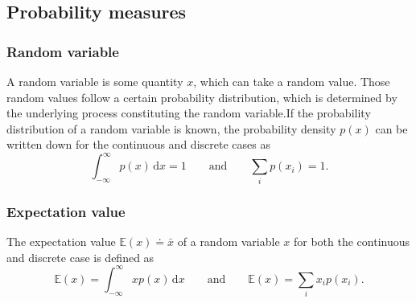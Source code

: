 \documentclass[a4paper,11pt]{article}
\numberwithin{equation}{section}
\begin{document}
\subsection{Probability measures}
\subsubsection{Random variable}
A random variable is some quantity $x$, which can take a random value. Those random values follow a certain probability distribution, which is determined by the underlying process constituting the random variable.If the probability distribution of a random variable is known, the probability density $p(x)$ can be written down for the continuous and discrete cases as \begin{equation}
	\int_{-\infty}^{\infty}p(x)\,\mathrm{d}x = 1 \qquad \text{and} \qquad \sum_{i} p(x_i) = 1.
\end{equation}

\subsubsection{Expectation value}
The expectation value $\mathbb{E}(x) \doteq \bar{x}$ of a random variable $x$ for both the continuous and discrete case is defined as \begin{equation}
	\mathbb{E}(x) = \int_{-\infty}^{\infty}xp(x)\,\mathrm{d}x \qquad \text{and} \qquad \mathbb{E}(x) = \sum_{i}x_ip(x_i).
\end{equation}
\end{document}
